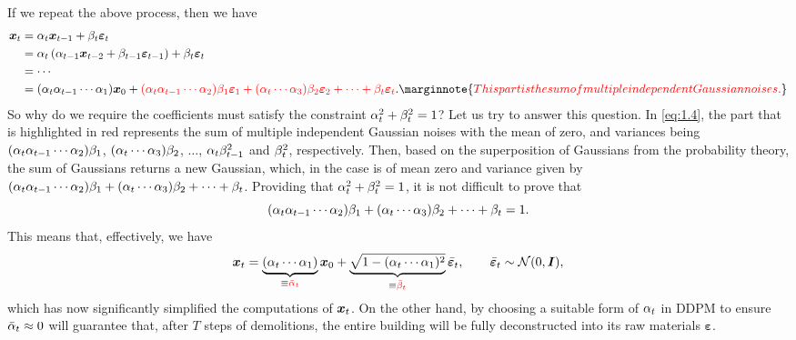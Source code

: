 If we repeat the above process, then we have
\begin{align}
\xt&=\alphat\xtm+\betat\et\nonumber\\
&=\alphat\left(\alphatm\bm{x}_{t-2}+\betatm\bm{\varepsilon}_{t-1}\right)+\betat\et\nonumber\\
&=\cdots\nonumber\\
&=(\alphat\alphatm\cdots\alpha_1)\bm{x}_0+\textcolor{red}{(\alphat\alphatm\cdots\alpha_2)\beta_1\bm{\varepsilon}_1+(\alphat\cdots\alpha_3)\beta_2\bm{\varepsilon}_2+\cdots+\betat\et}. \marginnote{\textcolor{red}{\footnotesize{This part is the sum of multiple independent Gaussian noises.}}}\label{eq:1.4}
\end{align}
So why do we require the coefficients must satisfy the constraint $\alpha_t^2+\beta_t^2=1$? Let us try to answer this question. In \cref{eq:1.4}, the part that is highlighted in red represents the sum of multiple independent Gaussian noises with the mean of zero, and variances being $(\alpha_t\alpha_{t-1}\cdots\alpha_2)\beta_1$, $(\alpha_t\cdots\alpha_3)\beta_2$, $\ldots$, $\alpha_t\beta_{t-1}^2$ and $\beta_t^2$, respectively. Then, based on the superposition of Gaussians from the probability theory, the sum of Gaussians returns a new Gaussian, which, in the case is of mean zero and variance given by $(\alpha_t\alpha_{t-1}\cdots\alpha_2)\beta_1+(\alpha_t\cdots\alpha_3)\beta_2+\cdots+\beta_t$. Providing that $\alpha_t^2+\beta_t^2=1$, it is not difficult to prove that 
\begin{equation}
    \label{eq:1.5}
(\alpha_t\alpha_{t-1}\cdots\alpha_2)\beta_1+(\alpha_t\cdots\alpha_3)\beta_2+\cdots+\beta_t=1.
\end{equation}
This means that, effectively, we have 
\begin{equation}
    \label{eq:1.6}
\bm{x}_{t}=\underbrace{(\alpha_t\cdots\alpha_1)}_{\equiv\textcolor{red}{\bar{\alpha}_t}}\bm{x}_0+\underbrace{\sqrt{1-(\alpha_t\cdots\alpha_1)^2}}_{\equiv\textcolor{red}{\bar{\beta}_t}}\bar{\bm{\varepsilon}}_t,\qquad\bar{\bm{\varepsilon}}_t\sim\mathcal{N}(0,\bm{I}),
\end{equation}
which has now significantly simplified the computations of $\bm{x}_{t}$. On the other hand, by choosing a suitable form of $\alpha_t$ in DDPM to ensure $\bar{\alpha}_t\approx0$ will guarantee that, after $T$ steps of demolitions, the entire building will be fully deconstructed into its raw materials $\bm{\varepsilon}$.

